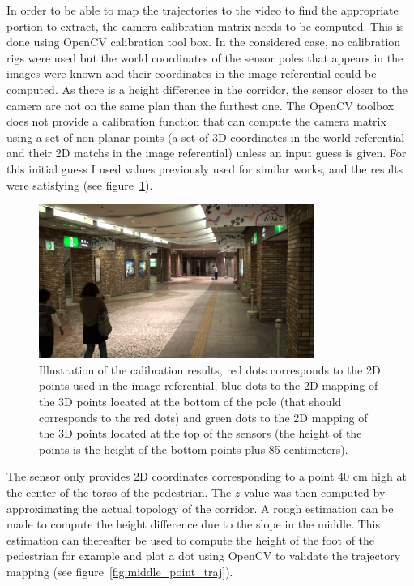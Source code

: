 \documentclass[12pt,a4paper,twoside]{article}
\begin{document}
In order to be able to map the trajectories to the video to find the appropriate portion to extract, the camera calibration matrix needs to be computed. This is done using OpenCV calibration tool box. In the considered case, no calibration rigs were used but the world coordinates of the sensor poles that appears in the images were known and their coordinates in the image referential could be computed. As there is a height difference in the corridor, the sensor closer to the camera are not on the same plan than the furthest one. The OpenCV toolbox does not provide a calibration function that can compute the camera matrix using a set of non planar points (a set of 3D coordinates in the world referential and their 2D matchs in the image referential) unless an input guess is given. For this initial guess I used values previously used for similar works, and the results were satisfying (see figure~\ref{fig:calibration}).

\begin{figure}
    \centering
        \includegraphics[width=0.8\textwidth]{images/calibration}
    \caption{Illustration of the calibration results, red dots corresponds to the 2D points used in the image referential, blue dots to the 2D mapping of the 3D points located at the bottom of the pole (that should corresponds to the red dots) and green dots to the 2D mapping of the 3D points located at the top of the sensors (the height of the points is the height of the bottom points plus 85 centimeters). }
    \label{fig:calibration}
\end{figure}

The sensor only provides 2D coordinates corresponding to a point 40 cm high at the center of the torso of the pedestrian. The $z$ value was then computed by approximating the actual topology of the corridor. A rough estimation can be made to compute the height difference due to the slope in the middle. This estimation can thereafter be used to compute the height of the foot of the pedestrian for example and plot a dot using OpenCV to validate the trajectory mapping (see figure~\ref{fig:middle_point_traj}).
\end{document}
